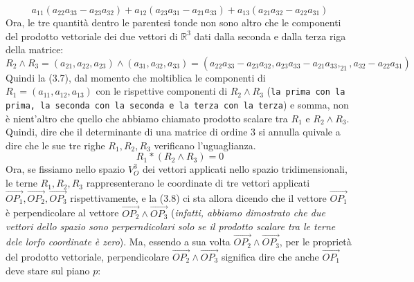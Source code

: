 \documentclass{book}
\begin{document}
\begin{equation}
	a_{11}(a_{22}a_{33}-a_{23}a_{32})+ a_{12}(a_{23}a_{31}-a_{21}a_{33})+a_{13}(a_{21}a_{32}-a_{22}a_{31})
\end{equation}
Ora, le tre quantità dentro le parentesi tonde non sono altro che le componenti del prodotto vettoriale dei due vettori di $\mathds{R}^3$ dati dalla seconda e dalla terza riga della matrice:
\begin{equation*}
	R_2\wedge R_3=(a_{21},a_{22},a_{23})\wedge(a_{31},a_{32},a_{33})=(a_{22}a_{33}-a_{23}a_{32},a_{23}a_{33}-a_{21}a_{33},_{21},a_{32}-a_{22}a_{31})
\end{equation*}
Quindi la (3.7), dal momento che moltiblica le componenti di $R_1=(a_{11},a_{12},a_{13})$ con le rispettive componenti di $R_2\wedge R_3$ ({\tt la prima con la prima, la seconda con la seconda e la terza con la terza}) e somma, non è nient'altro che quello che abbiamo chiamato prodotto scalare tra $R_1$ e $R_2 \wedge R_3$. Quindi, dire che il determinante di una matrice di ordine 3 si annulla quivale a dire che le sue tre righe $R_1,R_2,R_3$ verificano l'uguaglianza.
\begin{equation}
	R_1*(R_2\wedge R_3)=0
\end{equation}
Ora, se fissiamo nello spazio $V^{3}_O$ dei vettori applicati nello spazio tridimensionali, le terne $R_1, R_2, R_3$ rappresenterano le coordinate di tre vettori applicati $\vec{OP_1}, \vec{OP_2}, \vec{OP_3}$ rispettivamente, e la (3.8) ci sta allora dicendo che il vettore $\vec{OP_1}$ è perpendicolare al vettore $\vec{OP_2}\wedge \vec{OP_3}$ ({\it infatti, abbiamo dimostrato che due vettori dello spazio sono perperndicolari solo se il prodotto scalare tra le terne dele lorfo coordinate è zero}). Ma, essendo a sua volta $\vec{OP_2}\wedge \vec{OP_3}$, per le proprietà del prodotto vettoriale, perpendicolare $\vec{OP_2}\wedge \vec{OP_3}$ significa dire che anche $\vec{OP_1}$ deve stare sul piano $p$:
\end{document}
